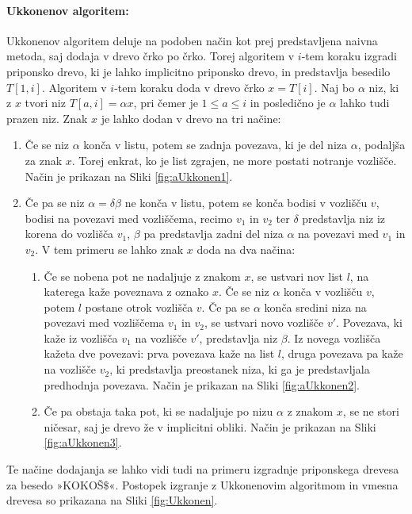 \paragraph{Ukkonenov algoritem:}
Ukkonenov algoritem deluje na podoben način kot prej predstavljena naivna metoda, saj dodaja v drevo črko po črko. Torej algoritem v $i$-tem koraku izgradi priponsko drevo, ki je lahko implicitno priponsko drevo, in predstavlja besedilo $T[1,i]$. Algoritem v $i$-tem koraku doda v drevo črko $x=T[i]$. Naj bo $\alpha$ niz, ki z $x$ tvori niz $T[a,i]=\alpha x$, pri čemer je $1\le a \le i $ in posledično je $\alpha$ lahko tudi prazen niz. Znak $x$ je lahko dodan v drevo na tri načine:
\begin{enumerate}
    \item Če se niz $\alpha$ konča v listu, potem se zadnja povezava, ki je del niza $\alpha$, podaljša za znak $x$. Torej enkrat, ko je list zgrajen, ne more postati notranje vozlišče. Način je prikazan na Sliki \ref{fig:aUkkonen1}.
    \item Če pa se niz $\alpha=\delta\beta$ ne konča v listu, potem se konča bodisi v vozlišču $v$, bodisi na povezavi med vozliščema, recimo $v_1$ in $v_2$ ter $\delta$ predstavlja niz iz korena do vozlišča $v_1$, $\beta$ pa predstavlja zadni del niza $\alpha$ na povezavi med $v_1$ in $v_2$. V tem primeru se lahko znak $x$ doda na dva načina:
    \begin{enumerate}
        \item \label{enum:dodajanje2} Če se nobena pot ne nadaljuje z znakom $x$, se ustvari nov list $l$, na katerega kaže poveznava z oznako $x$. Če se niz $\alpha$ konča v vozlišču $v$, potem $l$ postane otrok vozlišča $v$. Če pa se $\alpha$ konča sredini niza na povezavi med vozliščema $v_1$ in $v_2$, se ustvari novo vozlišče $v'$. Povezava, ki kaže iz vozlišča $v_1$ na vozlišče $v'$, predstavlja niz $\beta$. Iz novega vozlišča kažeta dve povezavi: prva povezava kaže na list $l$, druga povezava pa kaže na vozlišče $v_2$, ki predstavlja preostanek niza, ki ga je predstavljala predhodnja povezava. Način je prikazan na Sliki \ref{fig:aUkkonen2}.
        \item \label{enum:dodajanje3} Če pa obstaja taka pot, ki se nadaljuje po nizu $\alpha$ z znakom $x$, se ne stori ničesar, saj je drevo že v implicitni obliki. Način je prikazan na Sliki \ref{fig:aUkkonen3}.
    \end{enumerate}    
\end{enumerate}
Te načine dodajanja se lahko vidi tudi na primeru izgradnje priponskega drevesa za besedo »KOKOŠ$\$$«. Postopek izgranje z Ukkonenovim algoritmom in vmesna drevesa so prikazana na Sliki \ref{fig:Ukkonen}.

